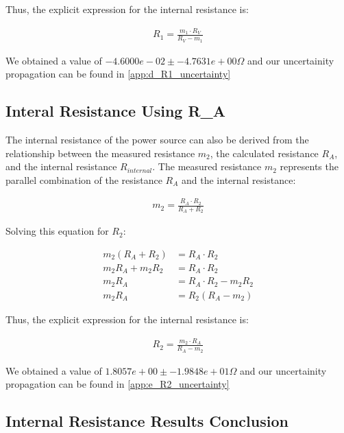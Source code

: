 \documentclass{article} %
\begin{document}
Thus, the explicit expression for the internal resistance is:

\begin{align*}
R_{1} = \frac{m_1 \cdot R_V}{R_V - m_1}
\end{align*}

We obtained a value of $-4.6000e-02 \pm -4.7631e+00 \Omega$ and our uncertainity propagation can be found in \ref{app:d_R1_uncertainty}

\subsection{Interal Resistance Using R\_A}

The internal resistance of the power source can also be derived from the relationship between the measured resistance $m_2$, the calculated resistance $R_A$, and the internal resistance $R_{internal}$. 
The measured resistance $m_2$ represents the parallel combination of the resistance $R_A$ and the internal resistance:

\begin{align*}
m_2 = \frac{R_A \cdot R_{2}}{R_A + R_{2}}
\end{align*}

Solving this equation for $R_{2}$:

\begin{align*}
m_2 (R_A + R_{2}) &= R_A \cdot R_{2} \\
m_2 R_A + m_2 R_{2} &= R_A \cdot R_{2} \\
m_2 R_A &= R_A \cdot R_{2} - m_2 R_{2} \\
m_2 R_A &= R_{2} (R_A - m_2)
\end{align*}

Thus, the explicit expression for the internal resistance is:

\begin{align*}
R_{2} = \frac{m_2 \cdot R_A}{R_A - m_2}
\end{align*}

We obtained a value of $1.8057e+00 \pm -1.9848e+01 \Omega$ and our uncertainity propagation can be found in \ref{app:e_R2_uncertainty}

\subsection{Internal Resistance Results Conclusion}
\end{document}
